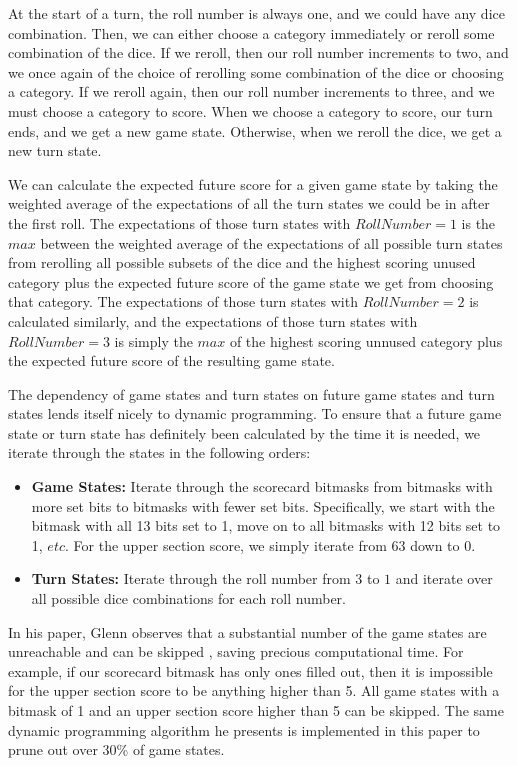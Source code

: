 \documentclass[12pt]{article}
\begin{document}
\noindent
At the start of a turn, the roll number is always one, and we could have any dice combination. Then, we can either choose a category immediately or reroll some combination of the dice. If we reroll, then our roll number increments to two, and we once again of the choice of rerolling some combination of the dice or choosing a category. If we reroll again, then our roll number increments to three, and we must choose a category to score. When we choose a category to score, our turn ends, and we get a new game state. Otherwise, when we reroll the dice, we get a new turn state.

We can calculate the expected future score for a given game state by taking the weighted average of the expectations of all the turn states we could be in after the first roll. The expectations of those turn states with $Roll Number = 1$ is the $max$ between the weighted average of the expectations of all possible turn states from rerolling all possible subsets of the dice and the highest scoring unused category plus the expected future score of the game state we get from choosing that category. The expectations of those turn states with $Roll Number = 2$ is calculated similarly, and the expectations of those turn states with $Roll Number = 3$ is simply the $max$ of the highest scoring unnused category plus the expected future score of the resulting game state.

The dependency of game states and turn states on future game states and turn states lends itself nicely to dynamic programming. To ensure that a future game state or turn state has definitely been calculated by the time it is needed, we iterate through the states in the following orders:

\begin{itemize}
    \item \textbf{Game States:} Iterate through the scorecard bitmasks from bitmasks with more set bits to bitmasks with fewer set bits. Specifically, we start with the bitmask with all 13 bits set to 1, move on to all bitmasks with 12 bits set to 1, $etc.$ For the upper section score, we simply iterate from 63 down to 0. 
    \item \textbf{Turn States:} Iterate through the roll number from $3$ to $1$ and iterate over all possible dice combinations for each roll number.
\end{itemize}

\noindent
In his paper, Glenn observes that a substantial number of the game states are unreachable and can be skipped \cite{glenn}, saving precious computational time. For example, if our scorecard bitmask has only ones filled out, then it is impossible for the upper section score to be anything higher than 5. All game states with a bitmask of 1 and an upper section score higher than 5 can be skipped. The same dynamic programming algorithm he presents is implemented in this paper to prune out over 30\% of game states.
\end{document}
